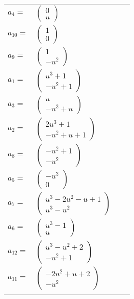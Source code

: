 \documentclass[1p]{elsarticle_modified}
\theoremstyle{definition}
\begin{document}
\begin{tabular}{m{7pt} m{180pt} m{7pt} m{180pt} }
\flushright $a_{4}=$&$\begin{pmatrix}0\\u\end{pmatrix}$ \\
\flushright $a_{10}=$&$\begin{pmatrix}1\\0\end{pmatrix}$ \\
\flushright $a_{9}=$&$\begin{pmatrix}1\\- u^2\end{pmatrix}$ \\
\flushright $a_{1}=$&$\begin{pmatrix}u^3+1\\- u^2+1\end{pmatrix}$ \\
\flushright $a_{3}=$&$\begin{pmatrix}u\\- u^3+u\end{pmatrix}$ \\
\flushright $a_{2}=$&$\begin{pmatrix}2 u^3+1\\- u^2+u+1\end{pmatrix}$ \\
\flushright $a_{8}=$&$\begin{pmatrix}- u^2+1\\- u^2\end{pmatrix}$ \\
\flushright $a_{5}=$&$\begin{pmatrix}- u^3\\0\end{pmatrix}$ \\
\flushright $a_{7}=$&$\begin{pmatrix}u^3-2 u^2- u+1\\u^3- u^2\end{pmatrix}$ \\
\flushright $a_{6}=$&$\begin{pmatrix}u^3-1\\u\end{pmatrix}$ \\
\flushright $a_{12}=$&$\begin{pmatrix}u^3- u^2+2\\- u^2+1\end{pmatrix}$ \\
\flushright $a_{11}=$&$\begin{pmatrix}-2 u^2+u+2\\- u^2\end{pmatrix}$\\&\end{tabular}
\end{document}
